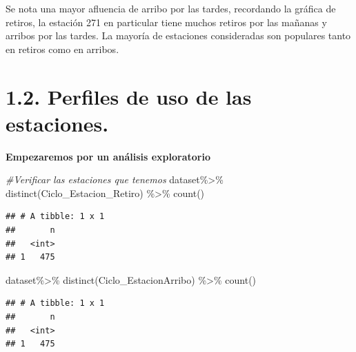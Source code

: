 \documentclass[
]{article}
\newenvironment{Shaded}{\begin{snugshade}}{\end{snugshade}}
\newcommand{\CommentTok}[1]{\textcolor[rgb]{0.56,0.35,0.01}{\textit{#1}}}
\newcommand{\FunctionTok}[1]{\textcolor[rgb]{0.00,0.00,0.00}{#1}}
\newcommand{\NormalTok}[1]{#1}
\newcommand{\SpecialCharTok}[1]{\textcolor[rgb]{0.00,0.00,0.00}{#1}}
\begin{document}
Se nota una mayor afluencia de arribo por las tardes, recordando la
gráfica de retiros, la estación 271 en particular tiene muchos retiros
por las mañanas y arribos por las tardes. La mayoría de estaciones
consideradas son populares tanto en retiros como en arribos.

\hypertarget{perfiles-de-uso-de-las-estaciones.}{%
\section{1.2. Perfiles de uso de las
estaciones.}\label{perfiles-de-uso-de-las-estaciones.}}

\textbf{Empezaremos por un análisis exploratorio}

\begin{Shaded}
\begin{Highlighting}[]
\CommentTok{\#Verificar las estaciones que tenemos}
\NormalTok{dataset}\SpecialCharTok{\%\textgreater{}\%} 
    \FunctionTok{distinct}\NormalTok{(Ciclo\_Estacion\_Retiro) }\SpecialCharTok{\%\textgreater{}\%} 
    \FunctionTok{count}\NormalTok{()}
\end{Highlighting}
\end{Shaded}

\begin{verbatim}
## # A tibble: 1 x 1
##       n
##   <int>
## 1   475
\end{verbatim}

\begin{Shaded}
\begin{Highlighting}[]
\NormalTok{dataset}\SpecialCharTok{\%\textgreater{}\%} 
    \FunctionTok{distinct}\NormalTok{(Ciclo\_EstacionArribo) }\SpecialCharTok{\%\textgreater{}\%} 
    \FunctionTok{count}\NormalTok{()}
\end{Highlighting}
\end{Shaded}

\begin{verbatim}
## # A tibble: 1 x 1
##       n
##   <int>
## 1   475
\end{verbatim}
\end{document}
